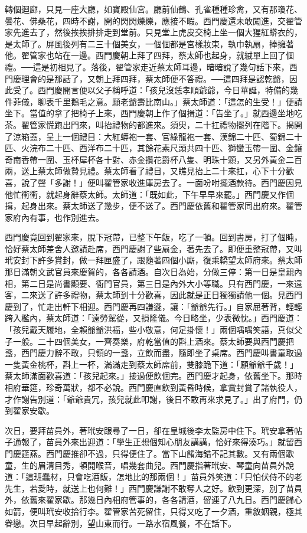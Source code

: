 轉個迴廊，只見一座大廳，如寶殿仙宮。廳前仙鶴、孔雀種種珍禽，又有那瓊花、曇花、佛桑花，四時不謝，開的閃閃爍爍，應接不暇。西門慶還未敢闖進，交翟管家先進去了，然後挨挨排排走到堂前。只見堂上虎皮交椅上坐一個大猩紅蟒衣的，是太師了。屏風後列有二三十個美女，一個個都是宮樣妝束，執巾執扇，捧擁著他。翟管家也站在一邊。西門慶朝上拜了四拜，蔡太師也起身，就絨單上回了個禮。──這是初相見了。落後，翟管家走近蔡太師耳邊，暗暗說了幾句話下來，西門慶理會的是那話了，又朝上拜四拜，蔡太師便不答禮。──這四拜是認乾爺，因此受了。西門慶開言便以父子稱呼道：「孩兒沒恁孝順爺爺，今日華誕，特備的幾件菲儀，聊表千里鵝毛之意。願老爺壽比南山。」蔡太師道：「這怎的生受！」便請坐下。當值的拿了把椅子上來，西門慶朝上作了個揖道：「告坐了。」就西邊坐地吃茶。翟管家慌跑出門來，叫抬禮物的都進來。須臾，二十扛禮物擺列在階下。揭開了涼箱蓋，呈上一個禮目：大紅蟒袍一套、官綠龍袍一套、漢錦二十匹、蜀錦二十匹、火浣布二十匹、西洋布二十匹，其餘花素尺頭共四十匹、獅蠻玉帶一圍、金鑲奇南香帶一圍、玉杯犀杯各十對、赤金攢花爵杯八隻、明珠十顆，又另外黃金二百兩，送上蔡太師做贄見禮。蔡太師看了禮目，又瞧見抬上二十來扛，心下十分歡喜，說了聲「多謝！」便叫翟管家收進庫房去了。一面吩咐擺酒款待。西門慶因見他忙衝衝，就起身辭蔡太師。太師道：「既如此，下午早早來罷。」西門慶又作個揖，起身出來。蔡太師送了幾步，便不送了。西門慶依舊和翟管家同出府來。翟管家府內有事，也作別進去。

西門慶竟回到翟家來，脫下冠帶，已整下午飯，吃了一頓。回到書房，打了個盹，恰好蔡太師差舍人邀請赴席，西門慶謝了些扇金，著先去了。即便重整冠帶，又叫玳安封下許多賞封，做一拜匣盛了，跟隨著四個小廝，復乘轎望太師府來。蔡太師那日滿朝文武官員來慶賀的，各各請酒。自次日為始，分做三停：第一日是皇親內相，第二日是尚書顯要、衙門官員，第三日是內外大小等職。只有西門慶，一來遠客，二來送了許多禮物，蔡太師到十分歡喜，因此就是正日獨獨請他一個。見西門慶到了，忙走出軒下相迎。西門慶再四謙遜，讓：「爺爺先行。」自家屈著背，輕輕跨入檻內，蔡太師道：「遠勞駕從，又損隆儀。今日略坐，少表微忱。」西門慶道：「孩兒戴天履地，全賴爺爺洪福，些小敬意，何足掛懷！」兩個喁喁笑語，真似父子一般。二十四個美女，一齊奏樂，府乾當值的斟上酒來。蔡太師要與西門慶把盞，西門慶力辭不敢，只領的一盞，立飲而盡，隨即坐了桌席。西門慶叫書童取過一隻黃金桃杯，斟上一杯，滿滿走到蔡太師席前，雙膝跪下道：「願爺爺千歲！」蔡太師滿面歡喜道：「孩兒起來。」接過便飲個完。西門慶才起身，依舊坐下。那時相府華筵，珍奇萬狀，都不必說。西門慶直飲到黃昏時候，拿賞封賞了諸執役人，才作謝告別道：「爺爺貴冗，孩兒就此叩謝，後日不敢再來求見了。」出了府門，仍到翟家安歇。

次日，要拜苗員外，著玳安跟尋了一日，卻在皇城後李太監房中住下。玳安拿著帖子通報了，苗員外來出迎道：「學生正想個知心朋友講講，恰好來得湊巧。」就留西門慶筵燕。西門慶推卻不過，只得便住了。當下山餚海錯不記其數。又有兩個歌童，生的眉清目秀，頓開喉音，唱幾套曲兒。西門慶指著玳安、琴童向苗員外說道：「這班蠢材，只會吃酒飯，怎地比的那兩個！」苗員外笑道：「只怕伏侍不的老先生，若愛時，就送上也何難！」西門慶謙謝不敢奪人之好。飲到更深，別了苗員外，依舊來翟家歇。那幾日內相府管事的，各各請酒，留連了八九日。西門慶歸心如箭，便叫玳安收拾行李。翟管家苦死留住，只得又吃了一夕酒，重敘姻親，極其眷戀。次日早起辭別，望山東而行。一路水宿風餐，不在話下。

